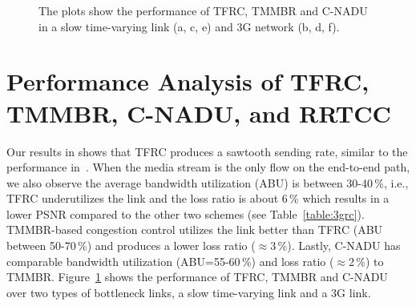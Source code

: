 \begin{figure}[!t]
  \centerline{
  }
  \centerline{
  }
  \centerline{
  }
  \caption{The plots show the performance of TFRC, TMMBR and C-NADU in a slow
  time-varying link (a, c, e) and 3G network (b, d, f).}
  \label{fig:3grc}
\end{figure}


\begin{table}[!t]
\caption{Comparing TFRC, TMMBR, C-NADU for calls over mobile nodes (180s
simulations using 3G traces).}
\label{table:3grc}
\end{table}

\section{Performance Analysis of TFRC, TMMBR, C-NADU, and RRTCC}

Our results in  shows that TFRC produces a sawtooth sending
rate, similar to the performance in~\cite{saurin:2006:thesis}. When the media
stream is the only flow on the end-to-end path, we also observe the average
bandwidth utilization (ABU) is between 30-40\,\%, i.e., TFRC underutilizes the
link and the loss ratio is about 6\,\% which results in a lower PSNR compared
to the other two schemes (see Table~\ref{table:3grc}). TMMBR-based congestion
control utilizes the link better than TFRC (ABU between 50-70\,\%) and
produces a lower loss ratio ($\approx$3\,\%). Lastly, C-NADU has comparable
bandwidth utilization (ABU=55-60\,\%) and loss ratio ($\approx$2\,\%) to
TMMBR. Figure~\ref{fig:3grc} shows the performance of TFRC, TMMBR and C-NADU
over two types of bottleneck links, a slow time-varying link and a 3G link.



